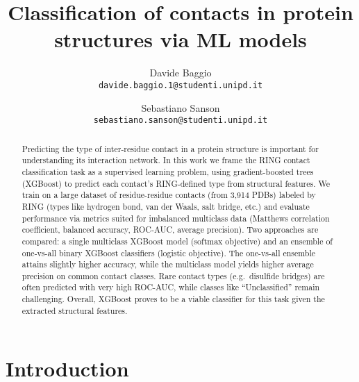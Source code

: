 \documentclass[10pt,twocolumn,letterpaper]{article}
\begin{document}
\title{Classification of contacts in protein structures via ML models}

\author{Davide Baggio\\
{\tt\small davide.baggio.1@studenti.unipd.it}
\and
Sebastiano Sanson\\
{\tt\small sebastiano.sanson@studenti.unipd.it}
}

\maketitle

\begin{abstract}
    Predicting the type of inter-residue contact in a protein structure is important for understanding its interaction network.  In this work we frame the RING contact classification task as a supervised learning problem, using gradient-boosted trees (XGBoost) to predict each contact's RING-defined type from structural features.  We train on a large dataset of residue-residue contacts (from 3,914 PDBs) labeled by RING (types like hydrogen bond, van der Waals, salt bridge, etc.) and evaluate performance via metrics suited for imbalanced multiclass data (Matthews correlation coefficient, balanced accuracy, ROC-AUC, average precision).  Two approaches are compared: a single multiclass XGBoost model (softmax objective) and an ensemble of one-vs-all binary XGBoost classifiers (logistic objective). The one-vs-all ensemble attains slightly higher accuracy, while the multiclass model yields higher average precision on common contact classes.  Rare contact types (e.g.\ disulfide bridges) are often predicted with very high ROC-AUC, while classes like “Unclassified” remain challenging.  Overall, XGBoost proves to be a viable classifier for this task given the extracted structural features.
\end{abstract}
    

\section{Introduction}
\end{document}
